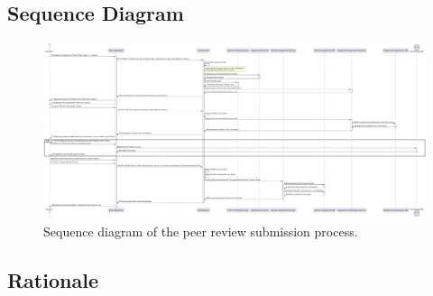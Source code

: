 \clearpage
\subsection{Sequence Diagram}

\begin{figure}[h]
    \centering
    \includegraphics[width=0.9\linewidth]{Architettura/imgs/pr_subm_seq.pdf}
    \caption{Sequence diagram of the peer review submission process.}
    \label{fig:seqPeerReviewSubmission}
\end{figure}

\subsection{Rationale}

